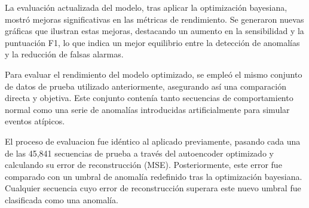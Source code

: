       La evaluación actualizada del modelo, tras aplicar la optimización bayesiana, mostró mejoras significativas en las métricas de rendimiento. Se generaron nuevas gráficas que ilustran estas mejoras, destacando un aumento en la sensibilidad y la puntuación F1, lo que indica un mejor equilibrio entre la detección de anomalías y la reducción de falsas alarmas.



      Para evaluar el rendimiento del modelo optimizado, se empleó el mismo conjunto de datos de prueba utilizado anteriormente, asegurando así una comparación directa y objetiva. Este conjunto contenía tanto secuencias de comportamiento normal como una serie de anomalías introducidas artificialmente para simular eventos atípicos.

      El proceso de evaluacion fue idéntico al aplicado previamente, pasando cada una de las 45,841 secuencias de prueba a través del autoencoder optimizado y calculando su error de reconstrucción (MSE). Posteriormente, este error fue comparado con un umbral de anomalía redefinido tras la optimización bayesiana. Cualquier secuencia cuyo error de reconstrucción superara este nuevo umbral fue clasificada como una anomalía.




